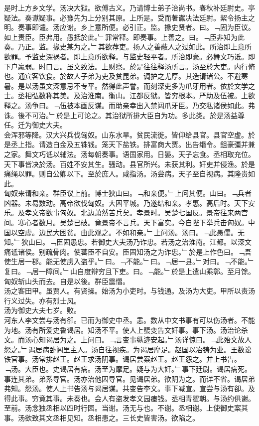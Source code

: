 \documentclass{zhvt-classic}
\begin{document}
\hspace*{2em}是时上方乡文学。汤决大狱。欲傅古义。乃请博士弟子治尚书。春秋补廷尉史。亭疑法。奏谳疑事。必豫先为上分别其原。上所是。受而著谳决法廷尉。絜令扬主之明。奏事即谴。汤应谢。乡上意所便。必引正。监。掾史贤者。曰。﹁固为臣议。如上责臣。臣弗用。愚抵於此。﹂罪常释。即奏事。上善之。曰。﹁臣非知为此奏。乃正。监。掾史某为之。﹂其欲荐吏。扬人之善蔽人之过如此。所治即上意所欲罪。予监史深祸者。即上意所欲释。与监史轻平者。所治即豪。必舞文巧诋。即下户羸弱。时口言。虽文致法。上财察。於是往往释汤所言。汤至於大吏。内行脩也。通宾客饮食。於故人子弟为吏及贫昆弟。调护之尤厚。其造请诸公。不避寒暑。是以汤虽文深意忌不专平。然得此声誉。而刻深吏多为爪牙用者。依於文学之士。丞相弘数称其美。及治淮南。衡山。江都反狱。皆穷根本。严助及伍被。上欲释之。汤争曰。﹁伍被本画反谋。而助亲幸出入禁闼爪牙臣。乃交私诸侯如此。弗诛。後不可治。﹂於是上可论之。其治狱所排大臣自为功。多此类。於是汤益尊任。迁为御史大夫。\\
\hspace*{2em}会浑邪等降。汉大兴兵伐匈奴。山东水旱。贫民流徙。皆仰给县官。县官空虚。於是丞上指。请造白金及五铢钱。笼天下盐铁。排富商大贾。出告缗令。鉏豪彊并兼之家。舞文巧诋以辅法。汤每朝奏事。语国家用。日晏。天子忘食。丞相取充位。天下事皆决於汤。百姓不安其生。骚动。县官所兴。未获其利。奸吏并侵渔。於是痛绳以罪。则自公卿以下。至於庶人。咸指汤。汤尝病。天子至自视病。其隆贵如此。\\
\hspace*{2em}匈奴来请和亲。群臣议上前。博士狄山曰。﹁和亲便。﹂上问其便。山曰。﹁兵者凶器。未易数动。高帝欲伐匈奴。大困平城。乃遂结和亲。孝惠。高后时。天下安乐。及孝文帝欲事匈奴。北边萧然苦兵矣。孝景时。吴楚七国反。景帝往来两宫间。寒心者数月。吴楚已破。竟景帝不言兵。天下富实。今自陛下举兵击匈奴。中国以空虚。边民大困贫。由此观之。不如和亲。﹂上问汤。汤曰。﹁此愚儒。无知。﹂狄山曰。﹁臣固愚忠。若御史大夫汤乃诈忠。若汤之治淮南。江都。以深文痛诋诸侯。别疏骨肉。使蕃臣不自安。臣固知汤之为诈忠。﹂於是上作色曰。﹁吾使生居一郡。能无使虏入盗乎。﹂曰。﹁不能。﹂曰。﹁居一县。﹂对曰。﹁不能。﹂复曰。﹁居一障间。﹂山自度辩穷且下吏。曰。﹁能。﹂於是上遣山乘鄣。至月馀。匈奴斩山头而去。自是以後。群臣震慴。\\
\hspace*{2em}汤之客田甲。虽贾人。有贤操。始汤为小吏时。与钱通。及汤为大吏。甲所以责汤行义过失。亦有烈士风。\\
\hspace*{2em}汤为御史大夫七岁。败。\\
\hspace*{2em}河东人李文尝与汤有卻。已而为御史中丞。恚。数从中文书事有可以伤汤者。不能为地。汤有所爱史鲁谒居。知汤不平。使人上蜚变告文奸事。事下汤。汤治论杀文。而汤心知谒居为之。上问曰。﹁言变事纵迹安起。﹂汤详惊曰。﹁此殆文故人怨之。﹂谒居病卧闾里主人。汤自往视疾。为谒居摩足。赵国以冶铸为业。王数讼铁官事。汤常排赵王。赵王求汤阴事。谒居尝案赵王。赵王怨之。并上书告。﹁汤。大臣也。史谒居有病。汤至为摩足。疑与为大奸。﹂事下廷尉。谒居病死。事连其弟。弟系导官。汤亦治他囚导官。见谒居弟。欲阴为之。而详不省。谒居弟弗知。怨汤。使人上书告汤与谒居谋。共变告李文。事下减宣。宣尝与汤有卻。及得此事。穷竟其事。未奏也。会人有盗发孝文园瘗钱。丞相青翟朝。与汤约俱谢。至前。汤念独丞相以四时行园。当谢。汤无与也。不谢。丞相谢。上使御史案其事。汤欲致其文丞相见知。丞相患之。三长史皆害汤。欲陷之。\\
\end{document}
